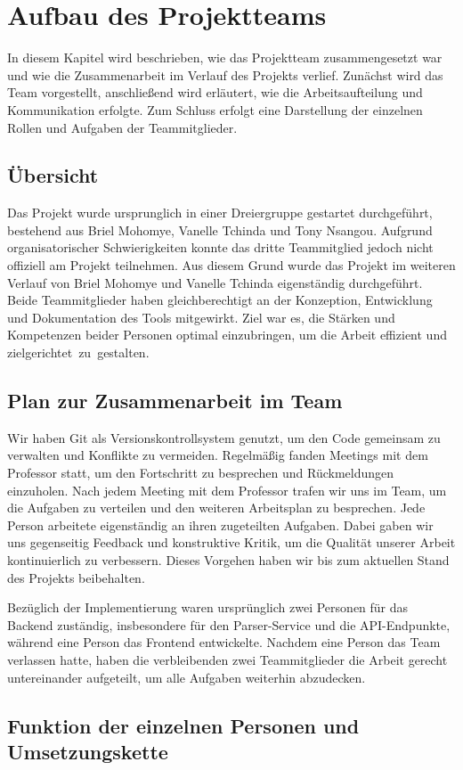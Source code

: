\chapter{Aufbau des Projektteams}
In diesem Kapitel wird beschrieben, wie das Projektteam zusammengesetzt war 
und wie die Zusammenarbeit im Verlauf des Projekts verlief. Zunächst 
wird das Team vorgestellt, anschließend wird erläutert, wie die 
Arbeitsaufteilung und Kommunikation erfolgte. Zum Schluss erfolgt eine 
Darstellung der einzelnen Rollen und Aufgaben der Teammitglieder.

\section{Übersicht}
Das Projekt wurde ursprunglich in einer Dreiergruppe gestartet durchgeführt, 
bestehend aus Briel Mohomye, Vanelle Tchinda und Tony Nsangou. Aufgrund 
organisatorischer Schwierigkeiten konnte das dritte Teammitglied jedoch 
nicht offiziell am Projekt teilnehmen. Aus diesem Grund wurde das Projekt 
im weiteren Verlauf von Briel Mohomye und Vanelle Tchinda eigenständig 
durchgeführt. Beide Teammitglieder haben gleichberechtigt an der Konzeption, 
Entwicklung und Dokumentation des Tools mitgewirkt. Ziel war es, 
die Stärken und Kompetenzen beider Personen optimal einzubringen, 
um die Arbeit effizient und zielgerichtet zu gestalten.

\section{Plan zur Zusammenarbeit im Team}
Wir haben Git als Versionskontrollsystem genutzt, um den Code gemeinsam zu
verwalten und Konflikte zu vermeiden. Regelmäßig fanden Meetings mit dem Professor  statt, 
um den Fortschritt zu besprechen und Rückmeldungen einzuholen. Nach jedem 
Meeting mit dem Professor trafen wir uns im Team, um die Aufgaben zu 
verteilen und den weiteren Arbeitsplan zu besprechen.
Jede Person arbeitete eigenständig an ihren zugeteilten Aufgaben.
Dabei gaben wir uns gegenseitig Feedback und konstruktive Kritik,
um die Qualität unserer Arbeit kontinuierlich zu verbessern. 
Dieses Vorgehen haben wir bis zum aktuellen Stand des Projekts beibehalten.

Bezüglich der Implementierung waren ursprünglich zwei Personen für das Backend zuständig,
insbesondere für den Parser-Service und die API-Endpunkte, während eine Person
das Frontend entwickelte. Nachdem eine Person das Team verlassen hatte,
haben die verbleibenden zwei Teammitglieder die Arbeit gerecht untereinander aufgeteilt, 
um alle Aufgaben weiterhin abzudecken.


\section{Funktion der einzelnen Personen und Umsetzungskette}